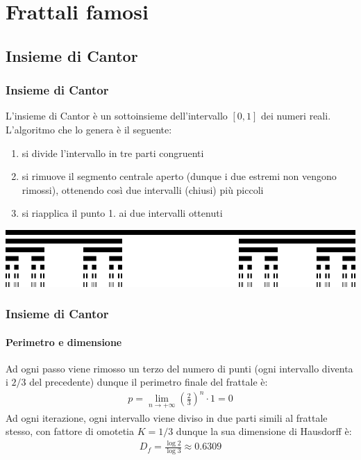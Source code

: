 \documentclass{beamer}
\begin{document}
	\section{Frattali famosi}
		\subsection{Insieme di Cantor}
			\begin{frame}
				\frametitle{Insieme di Cantor}
					L'insieme di Cantor è un sottoinsieme dell'intervallo $[0, 1]$ dei numeri reali.
					L'algoritmo che lo genera è il seguente:
					\begin{enumerate}
						\item si divide l'intervallo in tre parti congruenti
						\item si rimuove il segmento centrale aperto (dunque i due estremi non vengono rimossi), ottenendo così due intervalli (chiusi) più piccoli
						\item si riapplica il punto 1. ai due intervalli ottenuti
					\end{enumerate}
					\begin{center}
						\includegraphics[width=0.9\linewidth]{"../Insieme di Cantor/cantor_set_in_seven_iterations"}
					\end{center}

			\end{frame}
			\begin{frame}
				\frametitle{Insieme di Cantor}
				\framesubtitle{Perimetro e dimensione}
				Ad ogni passo viene rimosso un terzo del numero di punti (ogni intervallo diventa i $2/3$ del precedente) dunque il perimetro finale del frattale è:
				\begin{gather*}
				p = \lim_{n \to +\infty} \left( \frac{2}{3} \right) ^ n \cdot 1 = 0
				\end{gather*}
				Ad ogni iterazione, ogni intervallo viene diviso in due parti simili al frattale stesso, con fattore di omotetia $K=1/3$ dunque la sua dimensione di Hausdorff è:
				\begin{gather*}
				D_f = \frac{\log 2}{\log 3} \approx 0.6309
				\end{gather*}
			\end{frame}
\end{document}
